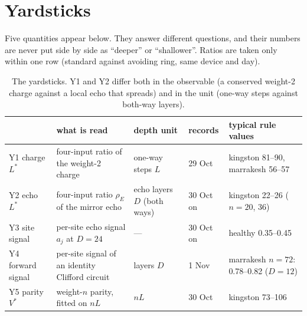 \documentclass[11pt]{article}
\begin{document}
\section{Yardsticks}\label{sec:yardsticks}

Five quantities appear below. They answer different questions, and their numbers are never put side by side as
``deeper'' or ``shallower''. Ratios are taken only within one row (standard against avoiding ring, same device and
day).

\begin{table}[h]
\centering\footnotesize
\begin{tabular}{p{2.3cm}p{4.3cm}p{2.4cm}p{1.4cm}p{3.6cm}}
\toprule
& what is read & depth unit & records & typical rule values \\
\midrule
Y1 charge $L^*$ & four-input ratio of the weight-2 charge & one-way steps $L$ & 29 Oct & kingston 81--90, marrakesh 56--57 \\
Y2 echo $L^*$ & four-input ratio $\rho_E$ of the mirror echo & echo layers $D$ (both ways) & 30 Oct on & kingston 22--26 ($n=20$, 36) \\
Y3 site signal & per-site echo signal $a_j$ at $D=24$ & --- & 30 Oct on & healthy 0.35--0.45 \\
Y4 forward signal & per-site signal of an identity Clifford circuit & layers $D$ & 1 Nov & marrakesh $n=72$: 0.78--0.82 ($D=12$) \\
Y5 parity $V^*$ & weight-$n$ parity, fitted on $nL$ & $nL$ & 30 Oct & kingston 73--106 \\
\bottomrule
\end{tabular}
\caption{The yardsticks. Y1 and Y2 differ both in the observable (a conserved weight-2 charge against a local echo
that spreads) and in the unit (one-way steps against both-way layers).}
\label{tab:yard}
\end{table}
\end{document}
